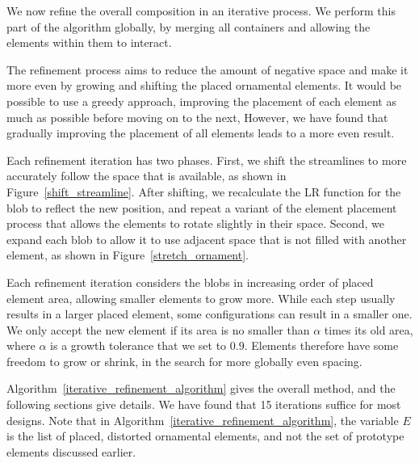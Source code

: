 We now refine the overall composition in an iterative process.  We perform
this part of the algorithm globally, by merging all containers and allowing the
elements within them to interact.

The refinement process aims to reduce the amount of negative space and make it
more even by growing and shifting the placed ornamental elements. It would be 
possible to use a greedy approach, improving the placement of each element as much
as possible before moving on to the next, However, we have found that gradually
improving the placement of all elements leads to a more even result.

Each refinement
iteration has two phases.
First, we shift the streamlines to more accurately follow the space that is available,
as shown in Figure~\ref{shift_streamline}. After shifting, we recalculate the LR function
for the blob to reflect the new position, and repeat a variant of the
element placement process
that allows the elements to rotate slightly in their space.
Second, we expand each blob to allow it to use adjacent space that is not 
filled with another element, as shown in Figure~\ref{stretch_ornament}.

Each refinement iteration considers the blobs in increasing order of 
placed element area, allowing smaller elements to grow more.   While each step
usually results in a larger placed element, some
configurations can result in a smaller one. We only accept the new element if its
area is no smaller than $\alpha$ times its old area, where $\alpha$ is a growth tolerance
that we set to $0.9$. Elements therefore have some freedom to grow or
shrink, in the search for more globally even spacing.

Algorithm~\ref{iterative_refinement_algorithm}
gives the overall method, and the following sections give details. We have found that
15 iterations suffice for most designs.
Note that in Algorithm~\ref{iterative_refinement_algorithm}, the variable
$E$ is the list of placed, distorted ornamental elements, and
not the set of prototype elements discussed earlier.

